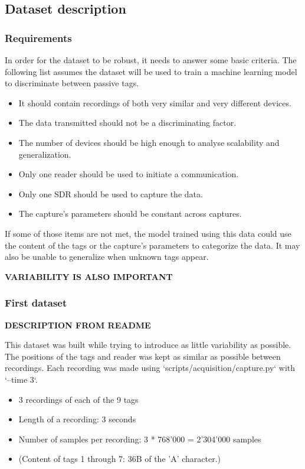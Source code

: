\subsection{Dataset description}

\subsubsection{Requirements}

In order for the dataset to be robust, it needs to answer some basic criteria. The following list assumes the dataset will be used to train a machine learning model to discriminate between passive tags.

\begin{itemize}
  \item It should contain recordings of both very similar and very different devices.
  \item The data transmitted should not be a discriminating factor.
  \item The number of devices should be high enough to analyse scalability and generalization.
  \item Only one reader should be used to initiate a communication.
  \item Only one SDR should be used to capture the data.
  \item The capture's parameters should be constant across captures.
\end{itemize}

If some of those items are not met, the model trained using this data could use the content of the tags or the capture's parameters to categorize the data. It may also be unable to generalize when unknown tags appear.

\textbf{VARIABILITY IS ALSO IMPORTANT}

\subsubsection{First dataset}

\textbf{DESCRIPTION FROM README}

This dataset was built while trying to introduce as little variability as possible. The positions of the tags and reader was kept as similar as possible between recordings. Each recording was made using `scripts/acquisition/capture.py` with `--time 3`.

\begin{itemize}
  \item 3 recordings of each of the 9 tags
  \item Length of a recording: 3 seconds
  \item Number of samples per recording: 3 * 768'000 = 2'304'000 samples
  \item (Content of tags 1 through 7: 36B of the 'A' character.)
\end{itemize}

